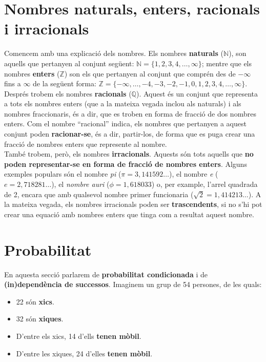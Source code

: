 \documentclass[12pt,a4paper]{article}
\begin{document}
\section{Nombres naturals, enters, racionals i irracionals}
Comencem amb una explicació dels nombres. Els nombres \textbf{naturals} (\(\mathbb{N}\)), son aquells que pertanyen al conjunt següent: \(\mathbb{N} = \{1, 2, 3, 4, \dots, \infty\}\); mentre que els nombres \textbf{enters} (\(\mathbb{Z}\)) son els que pertanyen al conjunt que comprén des de \(-\infty\) fins a \(\infty\) de la següent forma: \(\mathbb{Z} = \{-\infty, \dots, -4, -3, -2, -1, 0, 1, 2, 3, 4, \dots, \infty\}\).\\

Després trobem els nombres \textbf{racionals} (\(\mathbb{Q}\)). Aquest és un conjunt que representa a tots els nombres enters (que a la mateixa vegada inclou als naturals) i als nombres fraccionaris, és a dir, que es troben en forma de fracció de dos nombres enters. Com el nombre ``racional'' indica, els nombres que pertanyen a aquest conjunt poden \textbf{racionar-se}, és a dir, partir-los, de forma que es puga crear una fracció de nombres enters que represente al nombre.\\

També trobem, però, els nombres \textbf{irracionals}. Aquests són tots aquells que \textbf{no poden representar-se en forma de fracció de nombres enters}. Alguns exemples populars són el nombre \textit{pi} (\(\pi = 3,141592\dots\)), el nombre \textit{e} (\(e = 2,718281\dots\)), el \textit{nombre auri} (\(\phi = 1,618033\)) o, per example, l'arrel quadrada de 2, encara que amb qualsevol nombre primer funcionaria (\(\sqrt{2} = 1,414213\dots\)). A la mateixa vegada, els nombres irracionals poden ser \textbf{trascendents}, si no s'hi pot crear una equació amb nombres enters que tinga com a resultat aquest nombre.

\section{Probabilitat}
En aquesta secció parlarem de \textbf{probabilitat condicionada} i de \textbf{(in)dependència de successos}. Imaginem un grup de 54 persones, de les quals:
\begin{itemize}
	\item 22 són \textbf{xics}.
	\item 32 són \textbf{xiques}.
	\item D'entre els xics, 14 d'ells \textbf{tenen mòbil}.
	\item D'entre les xiques, 24 d'elles \textbf{tenen mòbil}.
\end{itemize}
\end{document}
